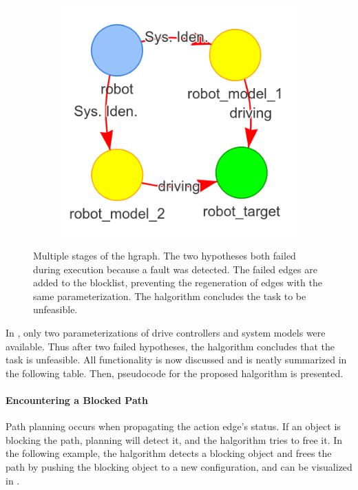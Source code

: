 \begin{figure}[H]
\begin{subfigure}{.3\textwidth}
    \end{subfigure}
    \begin{subfigure}{.3\textwidth}
    \centering
    \includegraphics[width=1\textwidth]{figures/proposed_method/connecting_nodes/failure/fail_7}
    \end{subfigure}
    \hfill
    \caption{Multiple stages of the \ac{hgraph}. The two hypotheses both failed during execution because a fault was detected. The failed edges are added to the blocklist, preventing the regeneration of edges with the same parameterization. The \ac{halgorithm} concludes the task to be unfeasible.}%
    \label{fig:failure_in_hgraph}
\end{figure}

In , only two parameterizations of drive controllers and system models were available. Thus after two failed hypotheses, the \ac{halgorithm} concludes that the task is unfeasible. All functionality is now discussed and is neatly summarized in the following table. Then, pseudocode for the proposed \ac{halgorithm} is presented.\bs

\paragraph{Encountering a Blocked Path}%
Path planning occurs when propagating the action edge's status. If an object is blocking the path, planning will detect it, and the \ac{halgorithm} tries to free it. In the following example, the \ac{halgorithm} detects a blocking object and frees the path by pushing the blocking object to a new configuration, and can be visualized in .\bs

